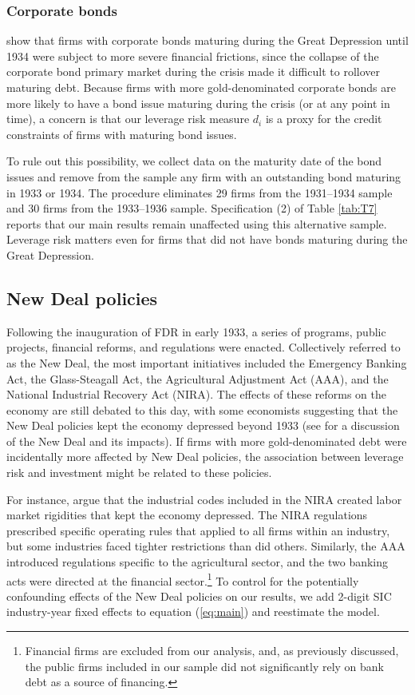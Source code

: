 \subsubsection{Corporate bonds}

\cite{Benmelech2018} show that firms with corporate bonds maturing during the Great Depression until 1934 were subject to more severe financial frictions, since the collapse of the corporate bond primary market during the crisis made it difficult to rollover maturing debt. Because firms with more gold-denominated corporate bonds are more likely to have a bond issue maturing during the crisis (or at any point in time), a concern is that our leverage risk measure $d_i$ is a proxy for the credit constraints of firms with maturing bond issues. 

To rule out this possibility, we collect data on the maturity date of the bond issues and remove from the sample any firm with an outstanding bond maturing in 1933 or 1934. The procedure eliminates 29 firms from the 1931--1934 sample and 30 firms from the 1933--1936 sample. Specification (2) of Table \ref{tab:T7} reports that our main results remain unaffected using this alternative sample. Leverage risk matters even for firms that did not have bonds maturing during the Great Depression.

\subsection{New Deal policies}

Following the inauguration of FDR in early 1933, a series of programs, public projects, financial reforms, and regulations were enacted. Collectively referred to as the New Deal, the most important initiatives included the Emergency Banking Act, the Glass-Steagall Act, the Agricultural Adjustment Act (AAA), and the National Industrial Recovery Act (NIRA). The effects of these reforms on the economy are still debated to this day, with some economists suggesting that the New Deal policies kept the economy depressed beyond 1933 (see \cite{Cole2004} for a discussion of the New Deal and its impacts). If firms with more gold-denominated debt were incidentally more affected by New Deal policies, the association between leverage risk and investment might be related to these policies.

For instance, \cite{Cole2004} argue that the industrial codes included in the NIRA created labor market rigidities that kept the economy depressed. The NIRA regulations prescribed specific operating rules that applied to all firms within an industry, but some industries faced tighter restrictions than did others. Similarly, the AAA introduced regulations specific to the agricultural sector, and the two banking acts were directed at the financial sector.\footnote{Financial firms are excluded from our analysis, and, as previously discussed, the public firms included in our sample did not significantly rely on bank debt as a source of financing.} To control for the potentially confounding effects of the New Deal policies on our results, we add 2-digit SIC industry-year fixed effects to equation (\ref{eq:main}) and reestimate the model.

